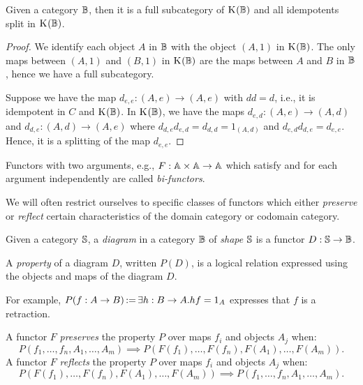\begin{lemma}\label{lem:split_category_splits_and_has_category}
  Given a category $\mathbb{B}$, then it is a full subcategory of $\text{K}_{}(\mathbb{B})$ and all idempotents split
  in  $\text{K}_{}(\mathbb{B})$.
\end{lemma}
\begin{proof}
  We identify each object $A$ in $\mathbb{B}$ with the object $(A,1)$ in $\text{K}_{}(\mathbb{B})$. The only maps between
  $(A,1)$ and $(B,1)$ in $\text{K}_{}(\mathbb{B})$ are the maps between $A$ and $B$ in $\mathbb{B}$, hence we have a
  full subcategory.

  Suppose we have the map $d_{e,e}: (A,e) \to (A,e)$ with $d d = d$, i.e., it is idempotent in $C$
  and $\text{K}_{}(\mathbb{B})$. In $\text{K}_{}(\mathbb{B})$, we have the maps $d_{e,d}:(A,e) \to (A,d)$ and $d_{d,e}:(A,d) \to
  (A,e)$ where $d_{d,e} d_{e,d} = d_{d,d} = 1_{(A,d)}$ and $d_{e,d} d_{d,e} = d_{e,e}$. Hence,
  it is a splitting of the map  $d_{e,e}$.
\end{proof}


Functors with two arguments, e.g., $F:\mathbb{A} \times \mathbb{A} \to \mathbb{A}$ which satisfy  and
 for each argument independently are called \emph{bi-functors}.


We will often restrict ourselves to specific classes of functors which either \emph{preserve} or
\emph{reflect} certain characteristics of the domain category or codomain category.

\begin{definition}\label{def:diagram_in_a_category}
  Given a category $\mathbb{S}$, a \emph{diagram}
  in a category $\mathbb{B}$ of \emph{shape} $\mathbb{S}$ is a functor $D:\mathbb{S} \to \mathbb{B}$.
\end{definition}

\begin{definition}\label{def:property_of_a_diagram}
  A \emph{property} of a diagram $D$, written $P(D)$, is a logical relation expressed using the
  objects and maps of the diagram $D$.
\end{definition}

For example,   $P(f:A \to B) \operatorname*{:\!=} \exists h : B \to A. h f = 1_A$ expresses that $f$ is a retraction.

\begin{definition}\label{def:functor_preserving_and_reflecting_a_property}
  A functor $F$ \emph{preserves} the property $P$ over maps $f_i$ and objects $A_j$ when:
  \[
     P(f_1,\ldots,f_n, A_1,\ldots,A_m) \implies P(F(f_1),\ldots,F(f_n), F(A_1),\ldots,F(A_m)).
  \]
  A functor $F$ \emph{reflects} the property $P$ over maps $f_i$ and objects $A_j$ when:
  \[
    P(F(f_1),\ldots,F(f_n), F(A_1),\ldots,F(A_m)) \implies P(f_1,\ldots,f_n, A_1,\ldots,A_m).
  \]
\end{definition}

